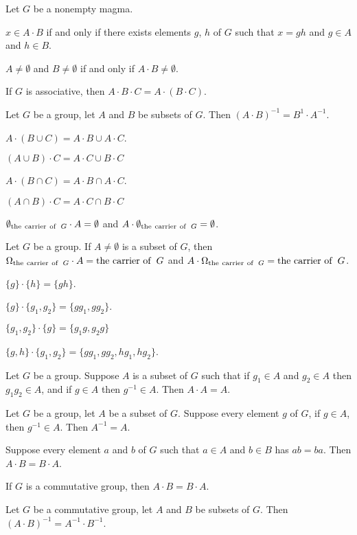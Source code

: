 \documentclass{article}
\begin{document}
Let $G$ be a nonempty magma.
\begin{thm}
\item\label{group2:8} $x\in A\cdot B$ if and only if there exists elements
  $g$, $h$ of $G$ such that $x=gh$ and $g\in A$ and $h\in B$.
\item\label{group2:9} $A\neq\emptyset$ and $B\neq\emptyset$ if and only
  if $A\cdot B\neq\emptyset$.
\item\label{group2:10} If $G$ is associative, then $A\cdot B\cdot C=A\cdot (B\cdot C)$.
\item\label{group2:11} Let $G$ be a group, let $A$ and $B$ be subsets of
  $G$. Then $(A\cdot B)^{-1}=B^{1}\cdot A^{-1}$.
\item\label{group2:12} $A\cdot(B\cup C)=A\cdot B\cup A\cdot C$.
\item\label{group2:13} $(A\cup B)\cdot C=A\cdot C\cup B\cdot C$
\item\label{group2:14} $A\cdot(B\cap C)=A\cdot B\cap A\cdot C$.
\item\label{group2:15} $(A\cap B)\cdot C=A\cdot C\cap B\cdot C$
\item\label{group2:16} $\emptyset_{\operatorname{the\ carrier\ of\ }G}\cdot A=\emptyset$ and
  $A\cdot\emptyset_{\operatorname{the\ carrier\ of\ }G}=\emptyset$.
\item\label{group2:17} Let $G$ be a group. If $A\neq\emptyset$ is a
  subset of $G$, then
  $\Omega_{\operatorname{the\ carrier\ of\ }G}\cdot A=\operatorname{the\ carrier\ of\ }G$ and $A\cdot\Omega_{\operatorname{the\ carrier\ of\ }G}=\operatorname{the\ carrier\ of\ }G$.
\item\label{group2:18} $\{g\}\cdot\{h\}=\{gh\}$.
\item\label{group2:19} $\{g\}\cdot\{g_{1},g_{2}\}=\{gg_{1},gg_{2}\}$.
\item\label{group2:20} $\{g_{1},g_{2}\}\cdot\{g\}=\{g_{1}g,g_{2}g\}$
\item\label{group2:21} $\{g,h\}\cdot\{g_{1},g_{2}\}=\{gg_{1},gg_{2},hg_{1},hg_{2}\}$.
\item\label{group2:22} Let $G$ be a group. Suppose $A$ is a subset of $G$ such that
  if $g_{1}\in A$ and $g_{2}\in A$ then $g_{1}g_{2}\in A$,
  and if $g\in A$ then $g^{-1}\in A$.
  Then $A\cdot A=A$.
\item\label{group2:23} Let $G$ be a group, let $A$ be a subset of $G$.
  Suppose every element $g$ of $G$, if $g\in A$,
  then $g^{-1}\in A$. Then $A^{-1}=A$.
\item\label{group2:24} Suppose every element $a$ and $b$ of $G$ such
  that $a\in A$ and $b\in B$ has $ab=ba$. Then $A\cdot B=B\cdot A$.
\item\label{group2:25} If $G$ is a commutative group, then $A\cdot B=B\cdot A$.
\item\label{group2:26} Let $G$ be a commutative group, let $A$ and $B$
  be subsets of $G$. Then $(A\cdot B)^{-1}=A^{-1}\cdot B^{-1}$.
\end{thm}
\end{document}
